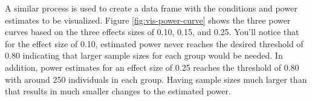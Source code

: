 \documentclass[man,mask,floatsintext]{apa6}
\newenvironment{Shaded}{\begin{snugshade}}{\end{snugshade}}
\newcommand{\ControlFlowTok}[1]{\textcolor[rgb]{0.13,0.29,0.53}{\textbf{#1}}}
\newcommand{\DataTypeTok}[1]{\textcolor[rgb]{0.13,0.29,0.53}{#1}}
\newcommand{\DecValTok}[1]{\textcolor[rgb]{0.00,0.00,0.81}{#1}}
\newcommand{\FloatTok}[1]{\textcolor[rgb]{0.00,0.00,0.81}{#1}}
\newcommand{\KeywordTok}[1]{\textcolor[rgb]{0.13,0.29,0.53}{\textbf{#1}}}
\newcommand{\NormalTok}[1]{#1}
\newcommand{\OperatorTok}[1]{\textcolor[rgb]{0.81,0.36,0.00}{\textbf{#1}}}
\newcommand{\StringTok}[1]{\textcolor[rgb]{0.31,0.60,0.02}{#1}}
\begin{document}
\begin{Shaded}
\end{Shaded}

A similar process is used to create a data frame with the conditions and power estimates to be visualized. Figure \ref{fig:vis-power-curve} shows the three power curves based on the three effects sizes of 0.10, 0.15, and 0.25. You'll notice that for the effect size of 0.10, estimated power never reaches the desired threshold of 0.80 indicating that larger sample sizes for each group would be needed. In addition, power estimates for an effect size of 0.25 reaches the threshold of 0.80 with around 250 individuals in each group. Having sample sizes much larger than that results in much smaller changes to the estimated power.
\end{document}
